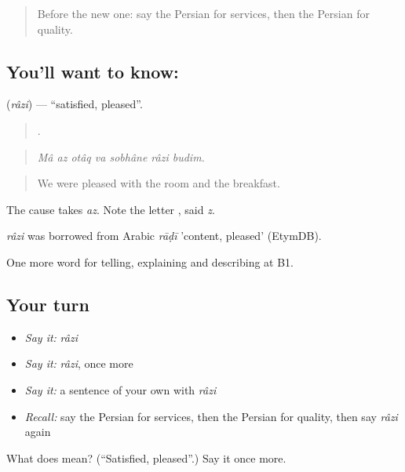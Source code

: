 \begin{quote}
Before the new one: say the Persian for services, then the Persian for quality.
\end{quote}

\subsection*{You'll want to know: }
\textbf{} (\emph{râzi}) — \textquotedblleft{}satisfied, pleased\textquotedblright{}.

\begin{quote}
      .
\end{quote}

\begin{quote}
\emph{Mâ az otâq va sobhâne râzi budim.}
\end{quote}

\begin{quote}
We were pleased with the room and the breakfast.
\end{quote}

The cause takes \emph{az}. Note the letter , said \emph{z}.

\begin{cousinweb}
\emph{râzi} was borrowed from Arabic \emph{rāḍī} 'content, pleased' (EtymDB).
\end{cousinweb}

\begin{grammarlens}[title={What you've built}]
One more word for telling, explaining and describing at B1.
\end{grammarlens}

\subsection*{Your turn}
\begin{itemize}
\raggedright
  \item \emph{Say it:} \emph{râzi}
  \item \emph{Say it:} \emph{râzi}, once more
  \item \emph{Say it:} a sentence of your own with \emph{râzi}
  \item \emph{Recall:} say the Persian for services, then the Persian for quality, then say \emph{râzi} again
\end{itemize}

\begin{tcolorbox}[breakable,colback=teal!4,colframe=teal!35!black,title={Before you move on}]
What does  mean? (\textquotedblleft{}Satisfied, pleased\textquotedblright{}.) Say it once more.
\end{tcolorbox}
